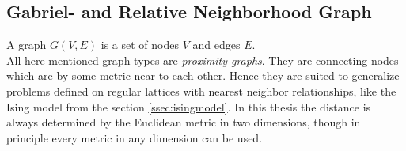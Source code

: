 \subsection{Gabriel- and Relative Neighborhood Graph}
\label{ssec:graphtypes}
    A graph \(G(V,E)\) is a set of nodes \(V\) and edges \(E\).\\
    All here mentioned graph types are \emph{proximity graphs}. They are
    connecting nodes which are by some metric near to each other.
    Hence they are suited to generalize problems defined on regular
    lattices with nearest neighbor relationships, like the Ising model
    from the section \ref{ssec:isingmodel}.
    In this thesis the distance is always determined by the Euclidean
    metric in two dimensions, though in principle every metric in any
    dimension can be used.\\

